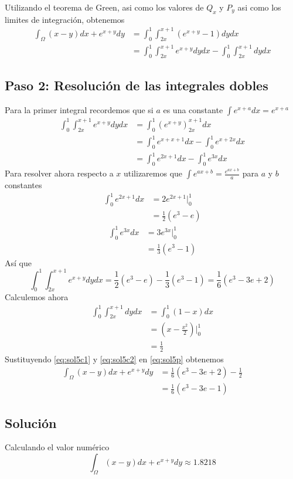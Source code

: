         Utilizando el teorema de Green, asi como los valores de $Q_x$ y $P_y$ asi como los limites de integración, obtenemos
        \begin{align}
            \int_\Omega (x - y)dx + e^{x+y}dy & = \int_0^1\int_{2x}^{x+1} (e^{x + y} - 1) dy dx \\
            & = \int_0^1\int_{2x}^{x+1}e^{x + y} dy dx - \int_0^1\int_{2x}^{x+1} dy dx
            \label{eq:sol5p}
        \end{align}
    \subsection*{Paso 2: Resolución de las integrales dobles}
        Para la primer integral recordemos que si $a$ es una constante $\int e^{x+a} dx = e^{x+a}$
        \begin{align*}
            \int_0^1\int_{2x}^{x+1} e^{x + y} dy dx & = \int_0^1 \left(e^{x + y}\right)_{2x}^{x+1} dx \\
            & = \int_0^1 e^{x + x + 1}dx - \int_0^1 e^{x + 2x}dx \\
            & = \int_0^1 e^{2x + 1}dx - \int_0^1 e^{3x}dx
        \end{align*}
        Para resolver ahora respecto a $x$ utilizaremos que $\int e^{ax + b} = \frac{e^{ax+b}}{a}$ para $a$ y $b$ constantes
        \begin{align*}
            \int_0^1 e^{2x + 1}dx & = 2 e^{2x + 1} |_0^1 \\
            & = \frac{1}{2}(e^3 - e)
        \end{align*}
        \begin{align*}
            \int_0^1 e^{3x}dx & = 3 e^{3x} |_0^1 \\
            & = \frac{1}{3}(e^3 - 1)
        \end{align*}
        Así que
        \begin{equation}
            \int_0^1\int_{2x}^{x+1} e^{x + y} dy dx = \frac{1}{2}(e^3 - e) - \frac{1}{3}(e^3 - 1) = \frac{1}{6}(e^3 -3e + 2)
            \label{eq:sol5c1}
        \end{equation} 
        Calculemos ahora
        \begin{align*}
            \int_0^1\int_{2x}^{x+1} dy dx & = \int_0^1(1-x) dx \\
            & = \left(x - \frac{x^2}{2}\right)|_0^1 \\
            & = \frac{1}{2}
            \label{eq:sol5c2} 
        \end{align*}
        Sustituyendo \eqref{eq:sol5c1} y \eqref{eq:sol5c2} en \eqref{eq:sol5p} obtenemos
        \begin{align}
            \int_\Omega (x - y)dx + e^{x+y}dy & = \frac{1}{6}(e^3 -3e + 2) - \frac{1}{2} \\
            & = \frac{1}{6}(e^3 -3e - 1)
        \end{align}
\subsection*{Solución}
    Calculando el valor numérico
    \begin{equation*}
        \boxed{ \int_\Omega (x - y)dx + e^{x+y}dy \approx 1.8218 }
    \end{equation*}